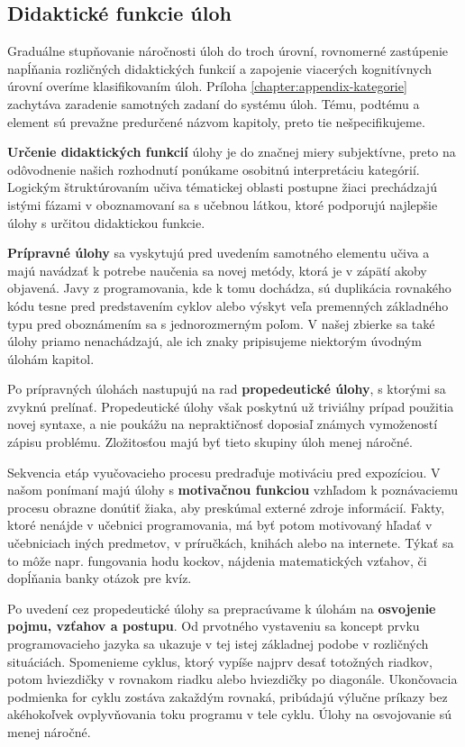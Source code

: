 \subsection{Didaktické funkcie úloh}
Graduálne stupňovanie náročnosti úloh do troch úrovní, rovnomerné zastúpenie napĺňania rozličných didaktických funkcií a zapojenie viacerých kognitívnych úrovní overíme klasifikovaním úloh. Príloha \ref{chapter:appendix-kategorie} zachytáva zaradenie samotných zadaní do systému úloh. Tému, podtému a element sú prevažne predurčené názvom kapitoly, preto tie nešpecifikujeme.

\textbf{Určenie didaktických funkcií} úlohy je do značnej miery subjektívne, preto na odôvodnenie našich rozhodnutí ponúkame osobitnú interpretáciu kategórií. Logickým štruktúrovaním učiva tématickej oblasti postupne žiaci prechádzajú istými fázami v oboznamovaní sa s učebnou látkou, ktoré podporujú najlepšie úlohy s určitou didaktickou funkcie.

\textbf{Prípravné úlohy} sa vyskytujú pred uvedením samotného elementu učiva a majú navádzať k potrebe naučenia sa novej metódy, ktorá je v zápätí akoby objavená. Javy z programovania, kde k tomu dochádza, sú duplikácia rovnakého kódu tesne pred predstavením cyklov alebo výskyt veľa premenných základného typu pred oboznámením sa s jednorozmerným poľom. V našej zbierke sa také úlohy priamo nenachádzajú, ale ich znaky pripisujeme niektorým úvodným úlohám kapitol.

Po prípravných úlohách nastupujú na rad \textbf{propedeutické úlohy}, s ktorými sa zvyknú prelínať. Propedeutické úlohy však poskytnú už triviálny prípad použitia novej syntaxe, a nie poukážu na nepraktičnosť doposiaľ známych vymožeností zápisu problému. Zložitosťou majú byť tieto skupiny úloh menej náročné.

Sekvencia etáp vyučovacieho procesu predraďuje motiváciu pred expozíciou. V našom ponímaní majú úlohy s \textbf{motivačnou funkciou} vzhľadom k poznávaciemu procesu obrazne donútiť žiaka, aby preskúmal externé zdroje informácií. Fakty, ktoré nenájde v učebnici programovania, má byť potom motivovaný hľadať v učebniciach iných predmetov, v príručkách, knihách alebo na internete. Týkať sa to môže napr. fungovania hodu kockov, nájdenia matematických vzťahov, či dopĺňania banky otázok pre kvíz.

Po uvedení cez propedeutické úlohy sa prepracúvame k úlohám na \textbf{osvojenie pojmu, vzťahov a postupu}. Od prvotného vystaveniu sa koncept prvku programovacieho jazyka sa
ukazuje v tej istej základnej podobe v rozličných situáciách. Spomenieme cyklus, ktorý vypíše najprv desať totožných riadkov, potom hviezdičky v rovnakom riadku alebo hviezdičky po diagonále. Ukončovacia podmienka for cyklu zostáva zakaždým rovnaká, pribúdajú výlučne príkazy bez akéhokoľvek ovplyvňovania toku programu v tele cyklu. Úlohy na osvojovanie sú menej náročné.

